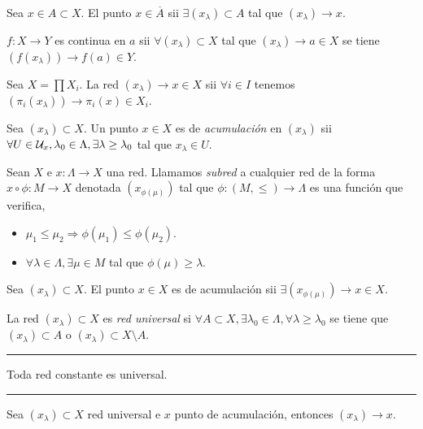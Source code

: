 \begin{proposition}
   Sea \(x\in A\subset X\). El punto \(x\in \overline{A}\) sii \(\exists (x_\lambda) \subset A \) tal que \((x_\lambda)\to x\).   
\end{proposition}
\begin{proposition}
    \(f:X\to Y\) es continua en \(a\) sii \(\forall (x_\lambda)\subset X\) tal que \((x_\lambda)\to a\in X\) se tiene \((f(x_\lambda)) \to f(a)\in Y \). 
\end{proposition}
\begin{proposition}
    Sea \(X=\prod X_i\). La red \((x_\lambda)\to x\in X\) sii \(\forall i \in I\) tenemos \((\pi_i(x_\lambda)) \to \pi_i(x)\in X_i\).   
\end{proposition}
\begin{definition}
    Sea \((x_\lambda)\subset X \). Un punto \(x\in X\) es de \emph{acumulación} en \((x_\lambda)\) sii \(\forall U\in \mathcal{U}_x,\lambda_0\in \Lambda, \exists \lambda\geq \lambda_0 \) tal que \(x_\lambda\in U\). 
\end{definition}
\begin{definition}
    Sean \(X\) e \(x:\Lambda \to X\) una red. Llamamos \emph{subred} a cualquier red de la forma \(x\circ\phi: M\to X\) denotada \((x_{\phi(\mu)})\) tal que \(\phi: (M,\leq) \to \Lambda\) es una función que verifica, 
    \begin{itemize}
        \item \(\mu_1\leq \mu_2 \Rightarrow \phi(\mu_1)\leq\phi(\mu_2). \)
        \item \(\forall \lambda\in \Lambda, \exists \mu\in M\) tal que \(\phi(\mu)\geq \lambda \). 
    \end{itemize}
\end{definition}
\begin{proposition}
    Sea \((x_\lambda)\subset X \). El punto \(x\in X \) es de acumulación sii \(\exists (x_{\phi(\mu)}) \to x\in X\). 
\end{proposition}
\begin{definition}
    La red \((x_\lambda)\subset X\) es \emph{red universal} si \(\forall A\subset X,\exists \lambda_0\in \Lambda,\forall \lambda\geq\lambda_0\) se tiene que \((x_\lambda)\subset A\) o \((x_\lambda)\subset X\setminus A\). 
\end{definition}

\E

\hrule  
\begin{example}
    Toda red constante es universal.   
\end{example}
\hrule

\E

\begin{proposition}
    Sea \((x_\lambda)\subset X\) red universal e \(x\) punto de acumulación, entonces \((x_\lambda)\to x\). 
\end{proposition}